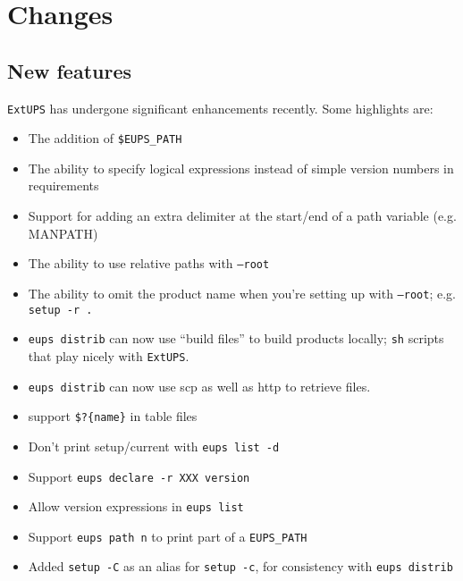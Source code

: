 \documentclass{article}
\newcommand{\code}[1]{\texttt{#1}}
\newcommand{\eups}{\code{ExtUPS}}
\begin{document}
\section{Changes}
\subsection{New features}

\eups{} has undergone significant enhancements recently.  Some
highlights are:

\begin{itemize}
  \item
    The addition of \code{\$EUPS\_PATH}

  \item
    The ability to specify logical expressions instead
    of simple version numbers in requirements

  \item
    Support for adding an extra delimiter at the
    start/end of a path variable (e.g. MANPATH)

  \item
    The ability to use relative paths with \code{--root}

  \item
    The ability to omit the product name when you're
    setting up with \code{--root}; e.g. \code{setup -r .}

  \item
    \code{eups distrib} can now use ``build files'' to
    build products locally; \code{sh} scripts that
    play nicely with \eups{}.

  \item
    \code{eups distrib} can now use scp as well as http to
    retrieve files.

  \item
    support \code{\$?\{name\}} in table files

  \item
    Don't print setup/current with \code{eups list -d}


  \item
    Support \code{eups declare -r XXX version}

  \item
    Allow version expressions in \code{eups list}

  \item
    Support \code{eups path n} to print part of a \code{EUPS\_PATH}

  \item
    Added \code{setup -C} as an alias for \code{setup -c}, for consistency with \code{eups distrib}


\end{itemize}
\end{document}
